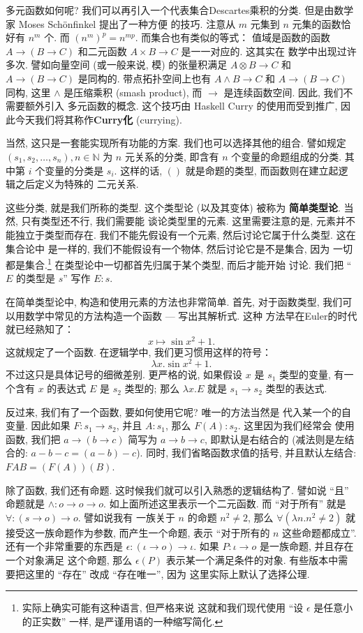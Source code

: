 多元函数如何呢? 我们可以再引入一个代表集合Descartes乘积的分类.
但是由数学家 Moses Sch\"onfinkel 提出了一种方便
的技巧. 注意从 \(m\) 元集到 \(n\)
元集的函数恰好有 \(n^m\) 个. 而 \((n^m)^p = n^{mp}\).
而集合也有类似的等式： 值域是函数的函数 \(A \to (B \to C)\)
和二元函数 \(A \times B \to C\) 是一一对应的. 这其实在
数学中出现过许多次. 譬如向量空间 (或一般来说, 模) 的张量积满足
\(A \otimes B \to C\) 和 \(A \to (B \to C)\) 是同构的.
带点拓扑空间上也有 \(A \wedge B \to C\) 和 \(A \to (B \to C)\)
同构, 这里 \(\wedge\) 是压缩乘积 (smash product), 而
\(\to\) 是连续函数空间. 因此, 我们不需要额外引入
多元函数的概念. 这个技巧由 Haskell Curry 的使用而受到推广,
因此今天我们将其称作\textbf{Curry化} (currying).

当然, 这只是一套能实现所有功能的方案. 我们也可以选择其他的组合.
譬如规定 \((s_1, s_2, \dots, s_n), n\in\mathbb N\) 为
\(n\) 元关系的分类, 即含有 \(n\) 个变量的命题组成的分类.
其中第 \(i\) 个变量的分类是 \(s_i\). 这样的话,
\(()\) 就是命题的类型, 而函数则在建立起逻辑之后定义为特殊的
二元关系.

这些分类, 就是我们所称的类型. 这个类型论 (以及其变体) 被称为%
\textbf{简单类型论}. 当然, 只有类型还不行, 我们需要能
谈论类型里的元素. 这里需要注意的是, 元素并不能独立于类型而存在.
我们不能先假设有一个元素, 然后讨论它属于什么类型. 这在集合论中
是一样的, 我们不能假设有一个物体, 然后讨论它是不是集合, 因为
一切都是集合.\footnote{实际上确实可能有这种语言, 但严格来说
这就和我们现代使用 “设 \(\epsilon\) 是任意小的正实数” 一样,
是严谨用语的一种缩写简化.} 在类型论中一切都首先归属于某个类型, 而后才能开始
讨论. 我们把 “\(E\) 的类型是 \(s\)” 写作 \(E : s\).

在简单类型论中, 构造和使用元素的方法也非常简单. 首先, 对于函数类型,
我们可以用数学中常见的方法构造一个函数 --- 写出其解析式. 这种
方法早在Euler的时代就已经熟知了：
\[x \mapsto \sin x^2 + 1.\]
这就规定了一个函数. 在逻辑学中, 我们更习惯用这样的符号：
\[\lambda x. \sin x^2 + 1.\]
不过这只是具体记号的细微差别. 更严格的说, 如果假设 \(x\) 是
\(s_1\) 类型的变量, 有一个含有 \(x\) 的表达式 \(E\) 是
\(s_2\) 类型的; 那么 \(\lambda x. E\) 就是 \(s_1 \to s_2\)
类型的表达式.

反过来, 我们有了一个函数, 要如何使用它呢? 唯一的方法当然是
代入某一个的自变量. 因此如果 \(F : s_1 \to s_2\), 并且
\(A : s_1\), 那么 \(F(A) : s_2\). 这里因为我们经常会
使用函数, 我们把 \(a \to (b \to c)\) 简写为 \(a \to b \to c\),
即默认是右结合的 (减法则是左结合的: \(a - b - c = (a - b) - c\)).
同时, 我们省略函数求值的括号, 并且默认左结合: \(FAB = (F(A))(B)\).

除了函数, 我们还有命题. 这时候我们就可以引入熟悉的逻辑结构了.
譬如说 “且” 命题就是 \(\wedge : o \to o \to o\).
如上面所述这里表示一个二元函数. 而 “对于所有” 就是
\(\forall : (s \to o) \to o\). 譬如说我有
一族关于 \(n\) 的命题 \(n^2 \ne 2\),
那么 \(\forall (\lambda n. n^2 \ne 2)\)
就接受这一族命题作为参数, 而产生一个命题, 表示 “对于所有的
\(n\) 这些命题都成立”. 还有一个非常重要的东西是
\(\epsilon : (\iota \to o) \to \iota\). 如果
\(P : \iota \to o\) 是一族命题, 并且存在一个对象满足
这个命题, 那么 \(\epsilon(P)\) 表示某一个满足条件的对象.
有些版本中需要把这里的 “存在” 改成 “存在唯一”, 因为
这里实际上默认了选择公理.

